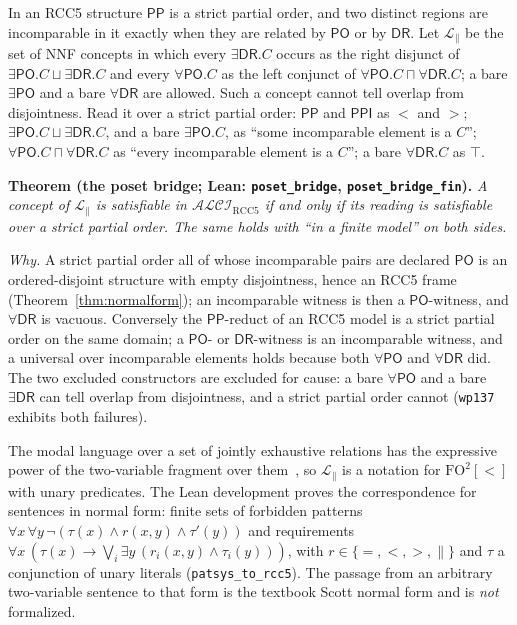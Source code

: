 \documentclass[11pt]{article}
\newcommand{\ALCIRCC}[1]{\mathcal{ALCI}_{\mathrm{RCC#1}}}
\newcommand{\DR}{\mathsf{DR}}
\newcommand{\PO}{\mathsf{PO}}
\newcommand{\PP}{\mathsf{PP}}
\newcommand{\PPI}{\mathsf{PPI}}
\newcommand{\code}[1]{\texttt{#1}}
\theoremstyle{plain}
\theoremstyle{definition}
\begin{document}
In an RCC5 structure $\PP$ is a strict partial order, and two distinct regions
are incomparable in it exactly when they are related by $\PO$ or by $\DR$. Let
$\mathcal L_{\parallel}$ be the set of NNF concepts in which every
$\exists\DR.C$ occurs as the right disjunct of
$\exists\PO.C\sqcup\exists\DR.C$ and every $\forall\PO.C$ as the left conjunct
of $\forall\PO.C\sqcap\forall\DR.C$; a bare $\exists\PO$ and a bare
$\forall\DR$ are allowed. Such a concept cannot tell overlap from
disjointness. Read it over a strict partial order: $\PP$ and $\PPI$ as $<$ and
$>$; $\exists\PO.C\sqcup\exists\DR.C$, and a bare $\exists\PO.C$, as ``some
incomparable element is a $C$''; $\forall\PO.C\sqcap\forall\DR.C$ as ``every
incomparable element is a $C$''; a bare $\forall\DR.C$ as $\top$.

\medskip\noindent\textbf{Theorem (the poset bridge; Lean:
\code{poset\_bridge}, \code{poset\_bridge\_fin}).}
\emph{A concept of $\mathcal L_{\parallel}$ is satisfiable in $\ALCIRCC5$ if
and only if its reading is satisfiable over a strict partial order. The same
holds with ``in a finite model'' on both sides.}\medskip

\noindent\emph{Why.} A strict partial order all of whose incomparable pairs
are declared $\PO$ is an ordered-disjoint structure with empty disjointness,
hence an RCC5 frame (Theorem~\ref{thm:normalform}); an incomparable witness is
then a $\PO$-witness, and $\forall\DR$ is vacuous. Conversely the $\PP$-reduct
of an RCC5 model is a strict partial order on the same domain; a $\PO$- or
$\DR$-witness is an incomparable witness, and a universal over incomparable
elements holds because both $\forall\PO$ and $\forall\DR$ did. The two
excluded constructors are excluded for cause: a bare $\forall\PO$ and a bare
$\exists\DR$ can tell overlap from disjointness, and a strict partial order
cannot (\texttt{wp137} exhibits both failures).

The modal language over a set of jointly exhaustive relations has the
expressive power of the two-variable fragment over
them~\cite{LutzWolter2006}, so $\mathcal L_{\parallel}$ is a notation for
$\mathrm{FO}^2[<]$ with unary predicates. The Lean development proves the
correspondence for sentences in normal form: finite sets of forbidden patterns
$\forall x\,\forall y\,\neg(\tau(x)\wedge r(x,y)\wedge\tau'(y))$ and
requirements $\forall x\,(\tau(x)\rightarrow\bigvee_i\exists y\,(r_i(x,y)\wedge
\tau_i(y)))$, with $r\in\{=,<,>,\parallel\}$ and $\tau$ a conjunction of unary
literals (\code{patsys\_to\_rcc5}). The passage from an arbitrary two-variable
sentence to that form is the textbook Scott normal form and is \emph{not}
formalized.
\end{document}
